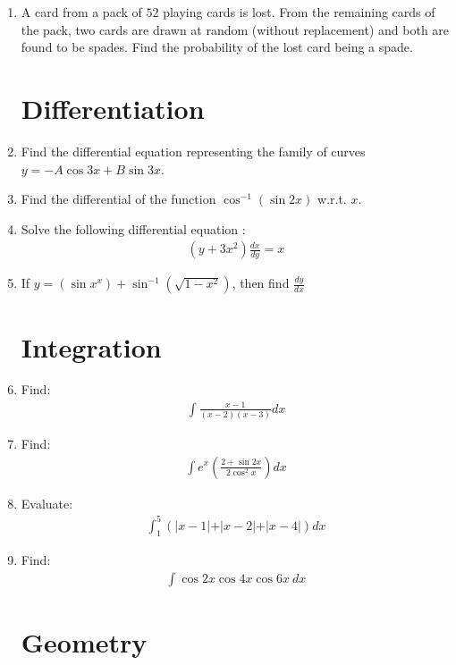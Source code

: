 \documentclass[10pt,-letter paper]{article}
\providecommand{\brak}[1]{\ensuremath{\left(#1\right)}}
\begin{document}
\begin{enumerate}
     \item A card from a pack of $52$ playing cards is lost. From the remaining cards of the pack, two cards are drawn at random (without replacement) and both are found to be spades. Find the probability of the lost card being a spade.
     
 
     \section{Differentiation}

     \item Find the differential equation representing the family of curves $y=-A \cos 3x+B \sin 3x$.

    \item Find the differential of the function $\cos^{-1}\brak{\sin 2x}$ w.r.t. $x$.

    \item Solve the following differential equation :
\begin{align*}          
	 \brak{y + 3x^{2}}\frac{dx}{dy}=x
\end{align*}


    \item If $y = \brak{\sin{x}^x}+\sin^{-1}\brak{\sqrt{1-x^2}}$, then find $\frac{dy}{dx}$
    
     \section{Integration}
    \item Find:
    \begin{align*}
		\int\frac{x-1}{\brak{x-2}\brak{x-3}}dx
\end{align*}

\item Find:
	\begin{align*}
		\int {e^x\brak{\frac{2+\sin 2x}{2 \cos^2 x}}} dx
	\end{align*}

\item Evaluate: 
	\begin{align*}
		\int_{1}^{5} \brak{\vert{x-1}\vert+\vert{x-2}\vert+\vert{x-4}\vert} dx
	\end{align*}
 
 \item Find:
	\begin{align*}
		\int\cos{2x}\cos{4x}\cos{6x}~dx
	\end{align*}
     
     \section{Geometry}
     

\end{enumerate}
\end{document}
